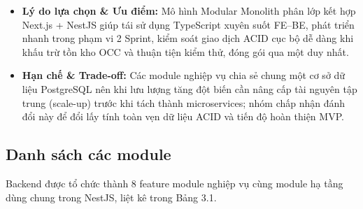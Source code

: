 \documentclass[12pt,a4paper]{report}
\begin{document}
\begin{itemize}[leftmargin=*]
\item \textbf{Lý do lựa chọn \& Ưu điểm:} Mô hình Modular Monolith phân lớp kết hợp Next.js + NestJS giúp tái sử dụng TypeScript xuyên suốt FE--BE, phát triển nhanh trong phạm vi 2 Sprint, kiểm soát giao dịch ACID cục bộ dễ dàng khi khấu trừ tồn kho OCC và thuận tiện kiểm thử, đóng gói qua một  duy nhất.
\item \textbf{Hạn chế \& Trade-off:} Các module nghiệp vụ chia sẻ chung một cơ sở dữ liệu PostgreSQL nên khi lưu lượng tăng đột biến cần nâng cấp tài nguyên tập trung (scale-up) trước khi tách thành microservices; nhóm chấp nhận đánh đổi này để đổi lấy tính toàn vẹn dữ liệu ACID và tiến độ hoàn thiện MVP.
\end{itemize}

\subsection{Danh sách các module}

Backend được tổ chức thành 8 feature module nghiệp vụ cùng module hạ tầng dùng chung trong NestJS, liệt kê trong Bảng 3.1.
\end{document}
